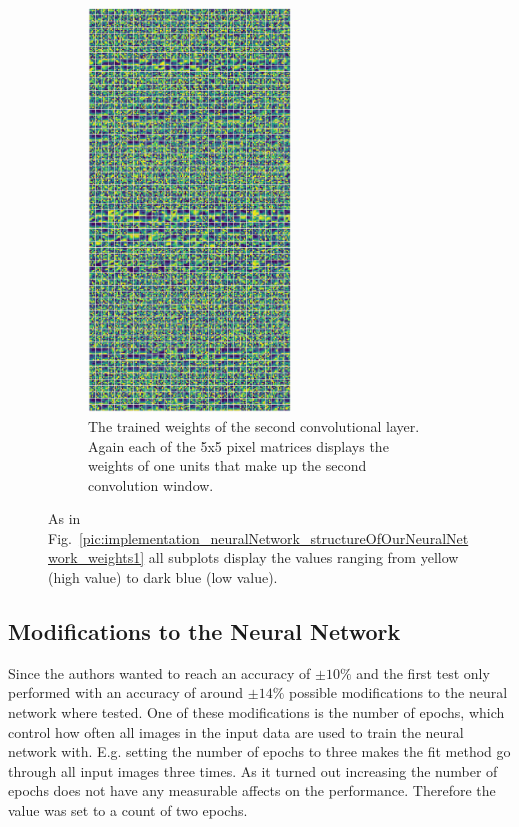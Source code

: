 \newpage

\begin{figure}[h!]
	\centering
	\begin{subfigure}[t]{\textwidth}
		\centering
		\includegraphics[width=0.59\textwidth]{img/implementation_neuralNetwork_structureOfOurNeuralNetwork_conv2D_2.pdf}
		\caption{The trained weights of the second convolutional layer. Again each of the 5x5 pixel matrices displays the weights of one units that make up the second convolution window.}
		\label{pic:implementation_neuralNetwork_structureOfOurNeuralNetwork_weights_b}
	\end{subfigure}
	\caption{As in Fig.~\ref{pic:implementation_neuralNetwork_structureOfOurNeuralNetwork_weights1} all subplots display the values ranging from yellow (high value) to dark blue (low value).}
	\label{pic:implementation_neuralNetwork_structureOfOurNeuralNetwork_weights2}
\end{figure}

\newpage

\subsection{Modifications to the Neural Network}
Since the authors wanted to reach an accuracy of $\pm 10\%$ and the first test only performed with an accuracy of around $\pm 14\%$ possible modifications to the neural network where tested. One of these modifications is the number of epochs, which control how often all images in the input data are used to train the neural network with. E.g. setting the number of epochs to three makes the fit method go through all input images three times. As it turned out increasing the number of epochs does not have any measurable affects on the performance. Therefore the value was set to a count of two epochs.

